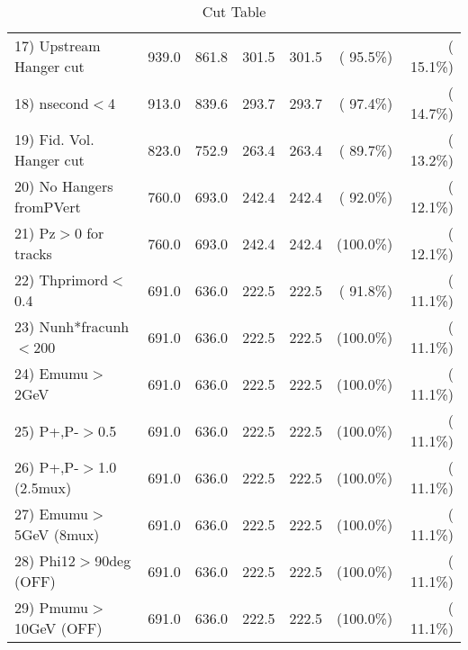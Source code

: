 \begin{table}[h!]
\begin{tabular}{||l||r|r|r|r|r|r||}
 17) Upstream Hanger cut  &        939.0 &        861.8 &        301.5 &        301.5 & ( 95.5\%) & ( 15.1\%) \\
 18) nsecond$<$4          &        913.0 &        839.6 &        293.7 &        293.7 & ( 97.4\%) & ( 14.7\%) \\
 19) Fid. Vol. Hanger cut &        823.0 &        752.9 &        263.4 &        263.4 & ( 89.7\%) & ( 13.2\%) \\
 20) No Hangers fromPVert &        760.0 &        693.0 &        242.4 &        242.4 & ( 92.0\%) & ( 12.1\%) \\
 21) Pz$>$0 for tracks    &        760.0 &        693.0 &        242.4 &        242.4 & (100.0\%) & ( 12.1\%) \\
 22) Thprimord$<$0.4      &        691.0 &        636.0 &        222.5 &        222.5 & ( 91.8\%) & ( 11.1\%) \\
 23) Nunh*fracunh$<$200   &        691.0 &        636.0 &        222.5 &        222.5 & (100.0\%) & ( 11.1\%) \\
 24) Emumu$>$2GeV         &        691.0 &        636.0 &        222.5 &        222.5 & (100.0\%) & ( 11.1\%) \\
 25) P+,P-$>$0.5          &        691.0 &        636.0 &        222.5 &        222.5 & (100.0\%) & ( 11.1\%) \\
 26) P+,P-$>$1.0 (2.5mux) &        691.0 &        636.0 &        222.5 &        222.5 & (100.0\%) & ( 11.1\%) \\
 27) Emumu$>$5GeV  (8mux) &        691.0 &        636.0 &        222.5 &        222.5 & (100.0\%) & ( 11.1\%) \\
 28) Phi12$>$90deg  (OFF) &        691.0 &        636.0 &        222.5 &        222.5 & (100.0\%) & ( 11.1\%) \\
 29) Pmumu$>$10GeV  (OFF) &        691.0 &        636.0 &        222.5 &        222.5 & (100.0\%) & ( 11.1\%) \\
 \hline
 \hline
 \end{tabular}
 \caption{Cut Table           }
 \label{tab-cutcohjpsi-mumu_ccdis}
 \end{table}
